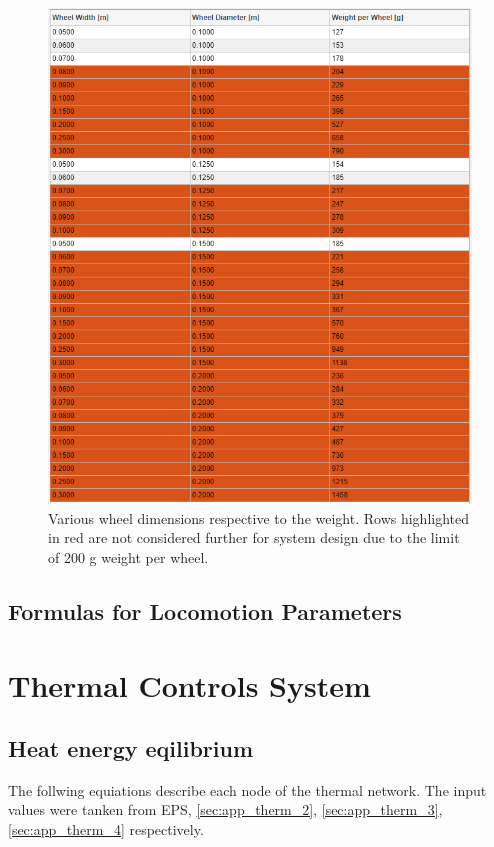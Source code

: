 \begin{figure}[htb] 
  \centering
     \includegraphics[width=1\textwidth]{Media/Dimensions-WeightLimits.png}
  \caption{Various wheel dimensions respective to the weight. Rows highlighted in red are not considered further for system design due to the limit of 200 g weight per wheel.}
  \label{fig:DimensionsLoco}
\end{figure}

\subsection{Formulas for Locomotion Parameters}
\label{app:FormulasLoco}


\clearpage
\section{Thermal Controls System} \label{sec:AppendixThermal}
\subsection{Heat energy eqilibrium}  \label{sec:app_tcs_01}
The follwing equiations describe each node of the thermal network.
The input values were tanken from EPS, \autoref{sec:app_therm_2}, \autoref{sec:app_therm_3}, \autoref{sec:app_therm_4} respectively.\\

